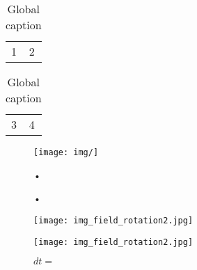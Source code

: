 


\begin{table}[!htb]
    \begin{minipage}{.5\linewidth}
      \centering
        \begin{tabular}{ll}
            1 & 2
        \end{tabular}
    \end{minipage}%
    \begin{minipage}{.5\linewidth}
      \centering
        \begin{tabular}{ll}
            3 & 4
        \end{tabular}
    \end{minipage}
    \caption{Global caption} 
\end{table}



\begin{figure}[!h]
	\begin{center}
		\texttt{[image: img/]}
		\caption{•}
		\label{•}
	\end{center}
\end{figure}



\begin{figure}[!h]
	\begin{center}
		\caption{•}
		\label{•}
	\end{center}
\end{figure}


% 

\begin{figure}[!htb]
    \centering
    \begin{minipage}{.5\textwidth}
        \centering
        \texttt{[image: img\_field\_rotation2.jpg]}
        \caption{$dt=0.1$}
        \label{fig:prob1_6_2}
    \end{minipage}%
    \begin{minipage}{0.5\textwidth}
        \centering
        \texttt{[image: img\_field\_rotation2.jpg]}
        \caption{$dt =$}
        \label{fig:prob1_6_1}
    \end{minipage}
\end{figure}

